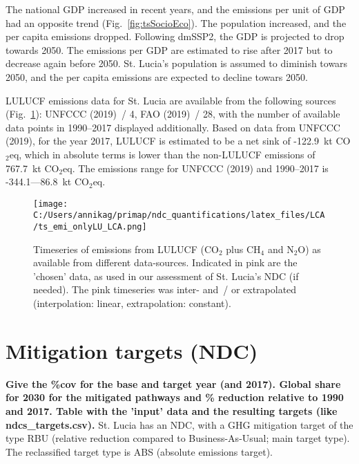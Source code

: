\documentclass[12pt]{article}
\begin{document}
 The national GDP increased in recent years, and the emissions per unit of GDP had an opposite trend (Fig.~\ref{fig:tsSocioEco}).
 The population increased, and the per capita emissions dropped. 
 Following dmSSP2, the GDP is projected to drop towards 2050. 
 The emissions per GDP are estimated to rise after 2017 but to decrease again before 2050. 
 St. Lucia's population is assumed to diminish towars 2050, and the per capita emissions are expected to decline towars 2050. 

 LULUCF emissions data for St. Lucia are available from the following sources (Fig.~\ref{fig:tsLULUCF}): UNFCCC (2019)~/ 4, FAO (2019)~/ 28, with the number of available data points in 1990--2017 displayed additionally.
 Based on data from UNFCCC (2019), for the year 2017, LULUCF is estimated to be a net sink of -122.9~kt CO$_2$eq, which in absolute terms is lower than the non-LULUCF emissions of 767.7~kt CO$_2$eq.
 The emissions range for UNFCCC (2019) and 1990--2017 is -344.1---86.8~kt CO$_2$eq.

 \begin{figure}[H]
 \centering
 \texttt{[image: C:/Users/annikag/primap/ndc\_quantifications/latex\_files/LCA/ts\_emi\_onlyLU\_LCA.png]}
 \caption{Timeseries of emissions from LULUCF (CO$_2$ plus CH$_4$ and N$_2$O) as available from different data-sources. 
 Indicated in pink are the 'chosen' data, as used in our assessment of St. Lucia's NDC (if needed). 
 The pink timeseries was inter- and~/ or extrapolated (interpolation: linear, extrapolation: constant).}
 \label{fig:tsLULUCF}
 \end{figure}

 \newpage %
 \section{Mitigation targets (NDC)}
 \label{sec:mitiTars}

 \textbf{ 
 Give the \%cov for the base and target year (and 2017). \newline
 Global share for 2030 for the mitigated pathways and \% reduction relative to 1990 and 2017. \newline
 Table with the 'input' data and the resulting targets (like ndcs\_targets.csv). \newline}
 St. Lucia has an NDC, with a GHG mitigation target of the type RBU (relative reduction compared to Business-As-Usual; main target type).
 The reclassified target type is ABS (absolute emissions target).
\end{document}
